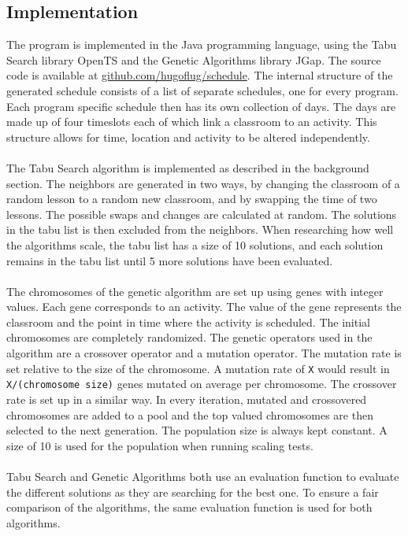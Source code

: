 \documentclass[titlepage,a4paper]{article}
\begin{document}
\subsection{Implementation}
The program is implemented in the Java programming language, using the Tabu Search library OpenTS and the Genetic Algorithms library JGap. The source code is available at \href{https://github.com/hugoflug/schedule}{github.com/hugoflug/schedule}.
The internal structure of the generated schedule consists of a list of separate schedules, one for every program. Each program specific schedule then has its own collection of days. The days are made up of four timeslots each of which link a classroom to an activity. This structure allows for time, location and activity to be altered independently. \\\\
The Tabu Search algorithm is implemented as described in the background section. The neighbors are generated in two ways, by changing the classroom of a random lesson to a random new classroom, and by swapping the time of two lessons. The possible swaps and changes are calculated at random. The solutions in the tabu list is then excluded from the neighbors. When researching how well the algorithms scale, the tabu list has a size of 10 solutions, and each solution remains in the tabu list until 5 more solutions have been evaluated. \\\\
The chromosomes of the genetic algorithm are set up using genes with integer values. Each gene corresponds to an activity. The value of the gene represents the classroom and the point in time where the activity is scheduled. The initial chromosomes are completely randomized. The genetic operators used in the algorithm are a crossover operator and a mutation operator. The mutation rate is set relative to the size of the chromosome. A mutation rate of \texttt{X} would result in \texttt{X/(chromosome size)} genes mutated on average per chromosome. The crossover rate is set up in a similar way. In every iteration, mutated and crossovered chromosomes are added to a pool and the top valued chromosomes are then selected to the next generation. The population size is always kept constant. A size of 10 is used for the population when running scaling tests. \\\\
Tabu Search and Genetic Algorithms both use an evaluation function to evaluate the different solutions as they are searching for the best one. To ensure a fair comparison of the algorithms, the same evaluation function is used for both algorithms. \\\\
\end{document}
